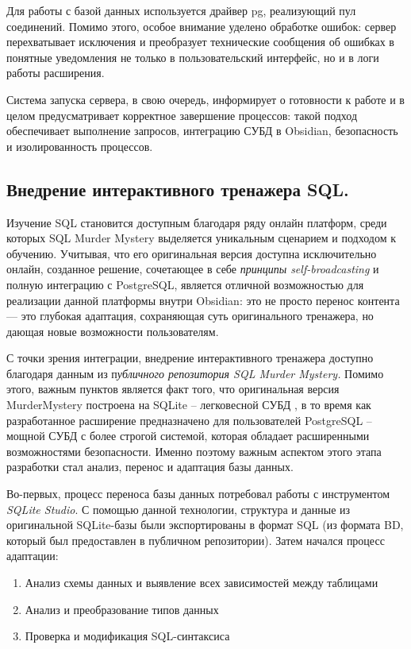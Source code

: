 \documentclass[14pt]{extarticle}
\begin{document}
	Для работы с базой данных используется драйвер pg, реализующий пул
	соединений. Помимо этого, особое внимание уделено обработке ошибок: сервер перехватывает исключения и преобразует технические сообщения об ошибках в понятные уведомления не только в пользовательский интерфейс,
	но и в логи работы расширения.
	\vspace{1em}
	
	Система запуска сервера, в свою очередь, информирует о готовности к
	работе и в целом предусматривает корректное завершение процессов: такой
	подход обеспечивает выполнение запросов, интеграцию СУБД в
	Obsidian, безопасность и изолированность процессов.
	\newpage
	\subsection{Внедрение интерактивного тренажера SQL.}
	\vspace{1em}
	Изучение SQL становится доступным благодаря ряду онлайн платформ, среди которых SQL Murder Mystery выделяется уникальным сценарием и подходом к обучению. Учитывая, что его оригинальная версия доступна исключительно онлайн, созданное решение, сочетающее в себе \textit{принципы self-broadcasting} и полную интеграцию с PostgreSQL, является отличной возможностью для реализации данной платформы внутри Obsidian: это не просто перенос контента — это глубокая адаптация, сохраняющая суть оригинального тренажера, но дающая новые возможности пользователям.
	\vspace{1em}
	
	С точки зрения интеграции, внедрение интерактивного тренажера доступно благодаря данным из п\textit{убличного репозитория SQL Murder Mystery.} Помимо этого, важным пунктов является факт того, что оригинальная версия MurderMystery построена на SQLite – легковесной СУБД , в то время как разработанное расширение предназначено для пользователей PostgreSQL – мощной СУБД с более строгой системой, которая обладает расширенными возможностями безопасности. Именно поэтому важным аспектом этого этапа разработки стал анализ, перенос и адаптация базы данных.
	
	Во-первых, процесс переноса базы данных потребовал работы с инструментом \textit{SQLite Studio}. С помощью данной технологии, структура и данные из оригинальной SQLite-базы были экспортированы в формат SQL (из формата BD, который был предоставлен в публичном репозитории). Затем начался процесс адаптации:
	\begin{enumerate}
		\item Анализ схемы данных и выявление всех зависимостей между таблицами
		\item Анализ и преобразование типов данных
		\item Проверка и модификация SQL-синтаксиса
	\end{enumerate}
	\vspace{1em}
	
\end{document}
